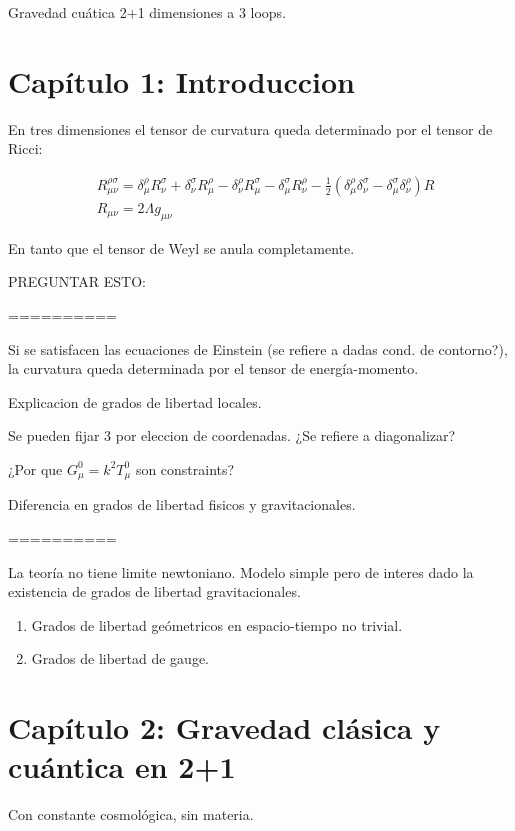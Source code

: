 \documentclass[a4paper, 12pt]{article}
\begin{document}
Gravedad cuática 2+1 dimensiones a 3 loops.


\section*{Capítulo 1: Introduccion}

En tres dimensiones el tensor de curvatura queda determinado por el tensor de Ricci:

\begin{align*}
&R_{\mu\nu}^{\rho\sigma} = \delta_\mu^\rho R_\nu^\sigma + \delta_\nu^\sigma R_\mu^\rho - \delta_\nu^\rho R_\mu^\sigma - \delta_\mu^\sigma R_\nu^\rho - \frac{1}{2}(\delta_\mu^\rho \delta_\nu^\sigma - \delta_\mu^\sigma \delta_\nu^\rho) R\\
&R_{\mu\nu} = 2\Lambda g_{\mu\nu}
\end{align*}

En tanto que el tensor de Weyl se anula completamente.

PREGUNTAR ESTO:\

==========

Si se satisfacen las ecuaciones de Einstein (se refiere a dadas cond. de contorno?), la curvatura queda determinada por el tensor de energía-momento.

Explicacion de grados de libertad locales.

Se pueden fijar 3 por eleccion de coordenadas. ¿Se refiere a diagonalizar?

¿Por que $G_\mu^0 = k^2 T_\mu^0$ son constraints?

Diferencia en grados de libertad fisicos y gravitacionales.

==========

La teoría no tiene limite newtoniano.
Modelo simple pero de interes dado la existencia de grados de libertad gravitacionales.

\begin{enumerate}
    \item Grados de libertad geómetricos en espacio-tiempo no trivial.
    \item Grados de libertad de gauge.
\end{enumerate}



\section*{Capítulo 2: Gravedad clásica y cuántica en 2+1}

Con constante cosmológica, sin materia.
\end{document}
